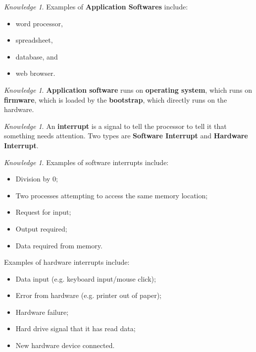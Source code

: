 \documentclass[8pt]{article}
\theoremstyle{remark}
\newtheorem{knowledge}[method]{Knowledge}
\begin{document}
            \begin{knowledge}
                Examples of \textbf{Application Softwares} include:
                \begin{itemize}
                    \item word processor,
                    \item spreadsheet,
                    \item database, and
                    \item web browser.
                \end{itemize}
            \end{knowledge}

            \begin{knowledge}
                \textbf{Application software} runs on \textbf{operating system}, which runs on \textbf{firmware}, which is loaded by the \textbf{bootstrap}, which directly runs on the hardware. 
            \end{knowledge}

            \begin{knowledge}
                An \textbf{interrupt} is a signal to tell the processor to tell it that something needs attention. Two types are \textbf{Software Interrupt} and \textbf{Hardware Interrupt}.
            \end{knowledge}

            \begin{knowledge}
                Examples of software interrupts include:
                \begin{itemize}
                    \item Division by 0;
                    \item Two processes attempting to access the same memory location;
                    \item Request for input;
                    \item Output required;
                    \item Data required from memory.
                \end{itemize}

                Examples of hardware interrupts include:
                \begin{itemize}
                    \item Data input (e.g. keyboard input/mouse click);
                    \item Error from hardware (e.g. printer out of paper);
                    \item Hardware failure;
                    \item Hard drive signal that it has read data;
                    \item New hardware device connected.
                \end{itemize}
            \end{knowledge}
\end{document}
